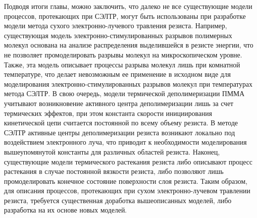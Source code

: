 \newpage
Подводя итоги главы, можно заключить, что далеко не все существующие модели процессов, протекающих при СЭЛТР, могут быть использованы при разработке модели метода сухого электронно-лучевого травления резиста. Например, существующая модель электронно-стимулированных разрывов полимерных молекул основана на анализе распределения выделившейся в резисте энергии, что не позволяет промоделировать разрывы молекул на микроскопическом уровне. Также, эта модель описывает процессы разрыва молекул лишь при комнатной температуре, что делает невозможным ее применение в исходном виде для моделирования электронно-стимулированных разрывов молекул при температурах метода СЭЛТР. В свою очередь, модели термической деполимеризации ПММА учитывают возникновение активного центра деполимеризации лишь за счет термических эффектов, при этом константа скорости инициирования кинетической цепи считается постоянной по всему объему резиста. В методе СЭЛТР активные центры деполимеризации резиста возникают локально под воздействием электронного луча, что приводит к необходимости моделирования вышеупомянутой константы для различных областей резиста. Наконец, существующие модели термического растекания резиста либо описывают процесс растекания в случае постоянной вязкости резиста, либо позволяют лишь промоделировать конечное состояние поверхности слоя резиста. Таким образом, для описания процессов, протекающих при сухом электронно-лучевом травлении резиста, требуется существенная доработка вышеописанных моделей, либо разработка на их основе новых моделей.
